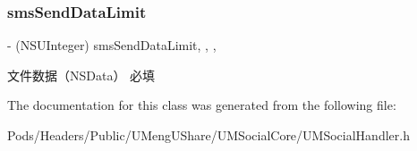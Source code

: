 \subsubsection{\texorpdfstring{sms\+Send\+Data\+Limit}{smsSendDataLimit}}
{\footnotesize\ttfamily -\/ (N\+S\+U\+Integer) sms\+Send\+Data\+Limit\hspace{0.3cm}{\ttfamily [read]}, {\ttfamily [write]}, {\ttfamily [nonatomic]}, {\ttfamily [assign]}}

文件数据（\+N\+S\+Data） 必填 

The documentation for this class was generated from the following file\+:\begin{DoxyCompactItemize}
\item 
Pods/\+Headers/\+Public/\+U\+Meng\+U\+Share/\+U\+M\+Social\+Core/U\+M\+Social\+Handler.\+h\end{DoxyCompactItemize}
